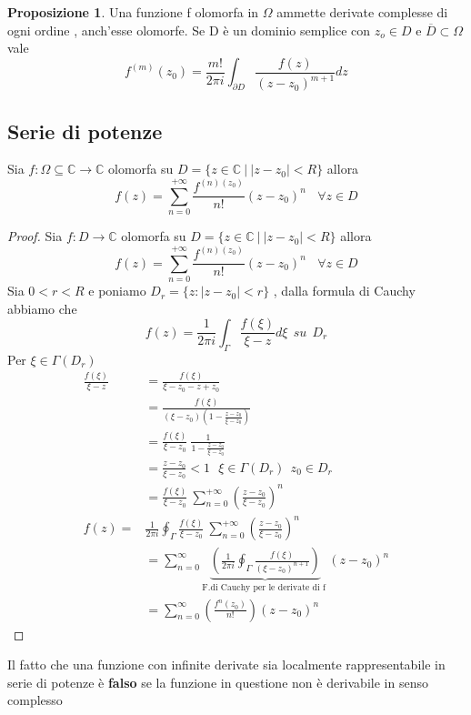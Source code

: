 \documentclass{article}
\theoremstyle{definition}
\newtheorem*{proposizione}{Proposizione}
\newcommand{\C}{\mathbb{C}}
\newcommand{\norm}[1]{|#1|}
\begin{document}
	\begin{proposizione}
		Una funzione f  olomorfa in $\Omega$ ammette derivate complesse di ogni ordine , anch'esse olomorfe. Se D è un dominio semplice con $z_o \in D$ e $\overline{D}\subset \Omega$ vale 
		$$f^{(m)}(z_0)=\frac{m!}{2 \pi i } \int_{\partial D}\frac{f(z)}{(z-z_0)^{m+1}}dz$$
 	\end{proposizione} 
 	\subsection{Serie di potenze}
	\begin{teo}{}{}
		Sia $f:\Omega \subseteq \C \rightarrow \C $ olomorfa su $D=\{z \in \C \ |\  \norm{z-z_0}<R\} $ allora 
		$$f(z)=\sum_{n=0}^{+\infty}\frac{f^{(n)(z_0)}}{n!}(z-z_0)^n \ \ \ \ \forall z \in D$$
	\end{teo}
	\begin{proof}
		Sia $f:D\rightarrow \C $ olomorfa su $D=\{z \in \C \ |\  \norm{z-z_0}<R\} $  allora 
	$$f(z)=\sum_{n=0}^{+\infty}\frac{f^{(n)(z_0)}}{n!}(z-z_0)^n \ \ \ \ \forall z \in D$$
	Sia $0<r<R$ e poniamo $D_r=\{z:\norm{z-z_0}<r\}$ , dalla formula di Cauchy abbiamo che 
$$f(z)=\frac{1}{2 \pi i } \int_{\Gamma} \frac{f(\xi)}{\xi-z}d\xi \ \ su \ \ D_r$$
Per $\xi \in \Gamma(D_r)$ 
\begin{align*}
	\frac{f(\xi)}{\xi-z}&=\frac{f(\xi)}{\xi-z_0-z+z_0}\\
	&=\frac{f(\xi)}{(\xi -z_0)\left(1-\frac{z-z_0}{\xi-z_0}\right)}\\
	&=\frac{f(\xi)}{\xi-z_0} \ \frac{1}{1-\frac{z-z_0}{\xi-z_0}} \\
	&= \frac{z-z_0}{\xi-z_0} < 1 \ \ \ \xi \in \Gamma(D_r) \ \ z_0 \in D_r\\
	&=\frac{f(\xi)}{\xi-z_0}  \ \sum_{n=0}^{+\infty}\left(\frac{z-z_0}{\xi-z_0} \right)^n \\
	f(z)=&\frac{1}{2 \pi i}\oint_{\Gamma}\frac{f(\xi)}{\xi-z_0}  \ \sum_{n=0}^{+\infty}\left(\frac{z-z_0}{\xi-z_0} \right)^n \\
	&=\sum_{n=0}^{\infty}\underbrace{\left(\frac{1}{2\pi i}\oint_{\Gamma}\frac{f(\xi)}{(\xi-z_0)^{n+1}}  \right)}_{\text{F.di Cauchy per le derivate di f }}(z-z_0)^n\\
	&=\sum_{n=0}^{\infty}\left(\frac{f^{n}(z_0)}{n!}\right)(z-z_0)^n
\end{align*}
	\end{proof}
	Il fatto che una funzione con infinite derivate sia localmente rappresentabile in serie di potenze è \textbf{falso} se la funzione in questione non è derivabile in senso complesso \\
\end{document}
